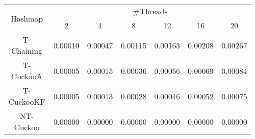 \begin{tabular}{|c|c|c|c|c|c|c|}
\hline
\multirow{2}{*}{Hashmap} & \multicolumn{6}{c|}{\#Threads}\\\cline{2-7}& 2 & 4 & 8 & 12 & 16 & 20\\
\hline
\hline
T-Chaining & 0.00010 & 0.00047 & 0.00115 & 0.00163 & 0.00208 & 0.00267\\
T-CuckooA & 0.00005 & 0.00015 & 0.00036 & 0.00056 & 0.00069 & 0.00084\\
T-CuckooKF & 0.00005 & 0.00013 & 0.00028 & 0.00046 & 0.00052 & 0.00075\\
NT-Cuckoo & 0.00000 & 0.00000 & 0.00000 & 0.00000 & 0.00000 & 0.00000\\
\hline
\end{tabular}
